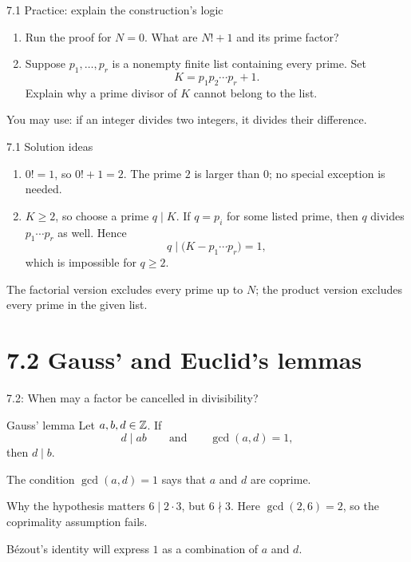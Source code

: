\begin{frame}{7.1 Practice: explain the construction's logic}
\begin{enumerate}
\item Run the proof for $N=0$. What are $N!+1$ and its prime factor?
\item Suppose $p_1,\ldots,p_r$ is a nonempty finite list containing every prime. Set
\[
K=p_1p_2\cdots p_r+1.
\]
Explain why a prime divisor of $K$ cannot belong to the list.
\end{enumerate}
You may use: if an integer divides two integers, it divides their difference.
\end{frame}

\begin{frame}{7.1 Solution ideas}
\begin{enumerate}
\item $0!=1$, so $0!+1=2$. The prime $2$ is larger than $0$; no special exception is needed.
\item $K\ge2$, so choose a prime $q\mid K$. If $q=p_i$ for some listed prime, then $q$ divides $p_1\cdots p_r$ as well. Hence
\[
q\mid\bigl(K-p_1\cdots p_r\bigr)=1,
\]
which is impossible for $q\ge2$.
\end{enumerate}
The factorial version excludes every prime up to $N$; the product version excludes every prime in the given list.
\end{frame}

\section{7.2 Gauss' and Euclid's lemmas}
\begin{frame}{7.2: When may a factor be cancelled in divisibility?}
\begin{block}{Gauss' lemma}
Let $a,b,d\in\mathbb{Z}$. If
\[
d\mid ab\qquad\text{and}\qquad\gcd(a,d)=1,
\]
then $d\mid b$.
\end{block}
The condition $\gcd(a,d)=1$ says that $a$ and $d$ are coprime.
\begin{block}{Why the hypothesis matters}
$6\mid2\cdot3$, but $6\nmid3$. Here $\gcd(2,6)=2$, so the coprimality assumption fails.
\end{block}
B\'ezout's identity will express $1$ as a combination of $a$ and $d$.
\end{frame}

